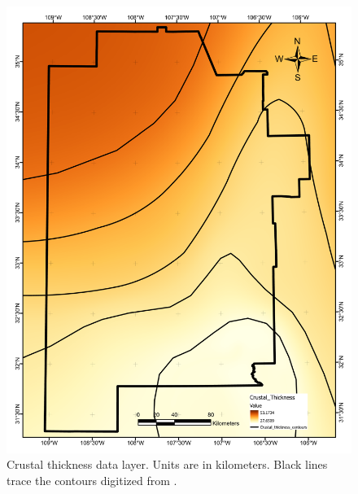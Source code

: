 \begin{figure}[H]
\centering
\includegraphics[width=0.75\linewidth]{templates/images/Figure-CrustalThickness.pdf}
\caption[Crustal thickness data layer]{Crustal thickness data layer. Units are in kilometers. Black lines trace the contours digitized from \protect\citet[Figure 4,][]{keller_comparative_1991}.}
\label{fig:feat_crust}
\end{figure}
\pagebreak

